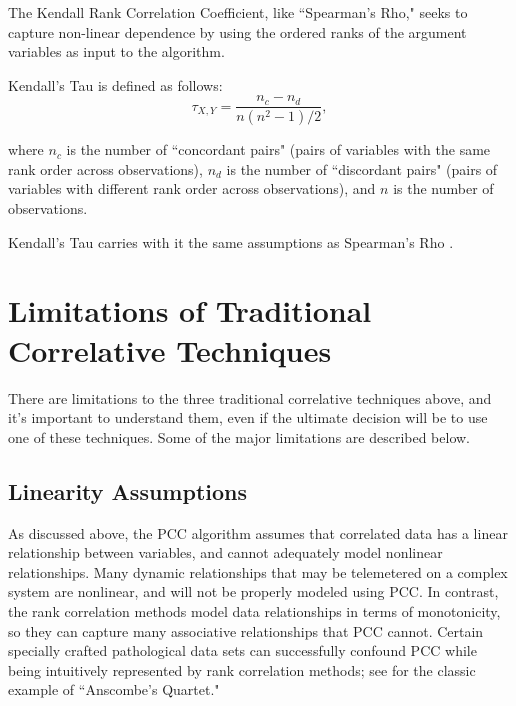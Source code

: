 The Kendall Rank Correlation Coefficient, like ``Spearman's Rho," seeks to capture non-linear dependence by using the ordered ranks of the argument variables as input to the algorithm.

Kendall's Tau is defined as follows:
\begin{equation} \label{eq:tau}
\tau_{X, Y} = \frac{n_{c} - n_{d}}{n(n^{2}-1)/2},
\end{equation}

where $n_{c}$ is the number of ``concordant pairs" (pairs of variables with the same rank order across observations), $n_{d}$ is the number of ``discordant pairs" (pairs of variables with different rank order across observations), and $n$ is the number of observations.

Kendall's Tau carries with it the same assumptions as Spearman's Rho \cite{kendalls2}.

\section{Limitations of Traditional Correlative Techniques}

There are limitations to the three traditional correlative techniques above, and it's important to understand them, even if the ultimate decision will be to use one of these techniques. Some of the major limitations are described below.

\subsection{Linearity Assumptions}

As discussed above, the PCC algorithm assumes that correlated data has a linear relationship between variables, and cannot adequately model nonlinear relationships. Many dynamic relationships that may be telemetered on a complex system are nonlinear, and will not be properly modeled using PCC. In contrast, the rank correlation methods model data relationships in terms of monotonicity, so they can capture many associative relationships that PCC cannot. Certain specially crafted pathological data sets can successfully confound PCC while being intuitively represented by rank correlation methods; see \cite{anscombe1973graphs} for the classic example of ``Anscombe's Quartet."


